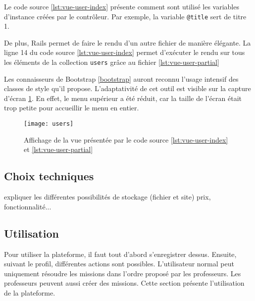 
Le code source \ref{lst:vue-user-index} présente comment sont utilisé les variables d'instance créées par le contrôleur. Par exemple, la variable \texttt{@title} sert de titre 1.


De plus, Rails permet de faire le rendu d'un autre fichier de manière élégante. La ligne 14 du code source \ref{lst:vue-user-index} permet d'exécuter le rendu sur tous les éléments de la collection \texttt{users} grâce au fichier \ref{lst:vue-user-partial}

Les connaisseurs de Bootstrap \ref{bootstrap} auront reconnu l'usage intensif des classes de style qu'il propose. L'adaptativité de cet outil est visible sur la capture d'écran \ref{fig:vue-users}. En effet, le menu supérieur a été réduit, car la taille de l'écran était trop petite pour accueillir le menu en entier.

\begin{figure}
  \begin{center}
    \texttt{[image: users]}
    \caption{Affichage de la vue présentée par le code source \ref{lst:vue-user-index} et \ref{lst:vue-user-partial}}
    \label{fig:vue-users}
  \end{center}
\end{figure}

\subsection{Choix techniques}
expliquer les différentes possibilités de stockage (fichier et site) prix, fonctionnalité...

\subsection{Utilisation}
Pour utiliser la plateforme, il faut tout d'abord s'enregistrer dessus. Ensuite, suivant le profil, différentes actions sont possibles. L'utilisateur normal peut uniquement résoudre les missions dans l'ordre proposé par les professeurs. Les professeurs peuvent aussi créer des missions. Cette section présente l'utilisation de la plateforme.

